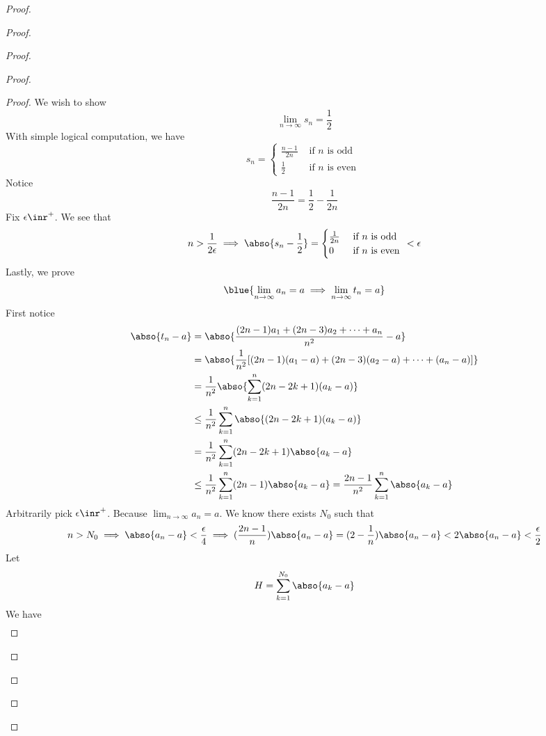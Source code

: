 \documentclass{report}
\begin{document}
\begin{proof}
\begin{proof}
\begin{proof}
\begin{proof}
\begin{proof}
We wish to show 
\begin{equation*}
\lim_{n\to\infty}s_n=\frac{1}{2}
\end{equation*}
With simple logical computation, we have
\begin{equation*}
s_n=\begin{cases}
  \frac{n-1}{2n}& \text{ if $n$ is odd }\\
  \frac{1}{2}& \text{ if $n$ is even }
\end{cases}
\end{equation*}
Notice 
\begin{equation*}
\frac{n-1}{2n}=\frac{1}{2}-\frac{1}{2n}
\end{equation*}
Fix $\epsilon \inr^+$. We see that 
\begin{equation*}
n>\frac{1}{2\epsilon }\implies \abso{s_n-\frac{1}{2}}=\begin{cases}
\frac{1}{2n}& \text{ if $n$ is odd }\\
 0& \text{ if $n$ is even } 
\end{cases}<\epsilon 
\end{equation*}
Lastly, we prove 
\begin{equation*}
\blue{\lim_{n\to\infty}a_n=a\implies \lim_{n\to\infty}t_n=a}
\end{equation*}
First notice
\begin{align*}
  \abso{t_n-a}&=\abso{\frac{(2n-1)a_1+(2n-3)a_2+\cdots + a_n}{n^2}-a}\\
&=\abso{\frac{1}{n^2}[(2n-1)(a_1-a)+(2n-3)(a_2-a)+\cdots +(a_n-a)]}\\
&=\frac{1}{n^2}\abso{\sum_{k=1}^n (2n-2k+1)(a_k -a)}\\
&\leq \frac{1}{n^2}\sum_{k=1}^n \abso{(2n-2k+1)(a_k-a)}\\
&= \frac{1}{n^2}\sum_{k=1}^n (2n-2k+1)\abso{a_k-a}\\
&\leq \frac{1}{n^2}\sum_{k=1}^n (2n-1)\abso{a_k-a}=\frac{2n-1}{n^2}\sum_{k=1}^n \abso{a_k-a}
\end{align*}
Arbitrarily pick $\epsilon \inr^+$. Because $\lim_{n\to\infty}a_n=a$. We know there exists $N_0$ such that
 \begin{equation*}
n>N_0\implies \abso{a_n-a}<\frac{\epsilon }{4}\implies (\frac{2n-1}{n})\abso{a_n-a}=(2-\frac{1}{n})\abso{a_n-a}<2\abso{a_n-a}<\frac{\epsilon}{2} 
\end{equation*}
Let
\begin{equation*}
H=\sum_{k=1}^{N_0} \abso{a_k-a}
\end{equation*}
We have
\begin{align*}

\end{align*}
\end{proof}
\end{proof}
\end{proof}
\end{proof}
\end{proof}
\end{document}
